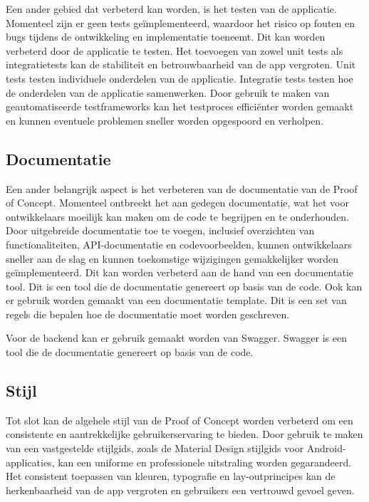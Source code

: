 Een ander gebied dat verbeterd kan worden, is het testen van de applicatie. Momenteel zijn er geen tests geïmplementeerd, waardoor het risico op fouten en bugs tijdens de ontwikkeling en implementatie toeneemt. Dit kan worden verbeterd door de applicatie te testen. Het toevoegen van zowel unit tests als integratietests kan de stabiliteit en betrouwbaarheid van de app vergroten. Unit tests testen individuele onderdelen van de applicatie. Integratie tests testen hoe de onderdelen van de applicatie samenwerken. Door gebruik te maken van geautomatiseerde testframeworks kan het testproces efficiënter worden gemaakt en kunnen eventuele problemen sneller worden opgespoord en verholpen. 

\subsection{Documentatie}

Een ander belangrijk aspect is het verbeteren van de documentatie van de Proof of Concept. 
Momenteel ontbreekt het aan gedegen documentatie, wat het voor ontwikkelaars moeilijk kan maken om de code te begrijpen en te onderhouden. Door uitgebreide documentatie toe te voegen, inclusief overzichten van functionaliteiten, API-documentatie en codevoorbeelden, kunnen ontwikkelaars sneller aan de slag en kunnen toekomstige wijzigingen gemakkelijker worden geïmplementeerd. Dit kan worden verbeterd aan de hand van een documentatie tool. Dit is een tool die de documentatie genereert op basis van de code. Ook kan er gebruik worden gemaakt van een documentatie template. Dit is een set van regels die bepalen hoe de documentatie moet worden geschreven.

\vspace{1cm}


Voor de backend kan er gebruik gemaakt worden van Swagger. Swagger is een tool die de documentatie genereert op basis van de code. 

\subsection{Stijl}

Tot slot kan de algehele stijl van de Proof of Concept worden verbeterd om een consistente en aantrekkelijke gebruikerservaring te bieden. Door gebruik te maken van een vastgestelde stijlgids, zoals de Material Design stijlgids voor Android-applicaties, kan een uniforme en professionele uitstraling worden gegarandeerd. Het consistent toepassen van kleuren, typografie en lay-outprincipes kan de herkenbaarheid van de app vergroten en gebruikers een vertrouwd gevoel geven.

